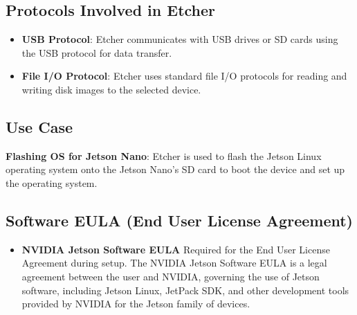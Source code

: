 \subsection*{Protocols Involved in Etcher}
\begin{itemize}
	\item \textbf{USB Protocol}: Etcher communicates with USB drives or SD cards using the USB protocol for data transfer.
	\item \textbf{File I/O Protocol}: Etcher uses standard file I/O protocols for reading and writing disk images to the selected device.
\end{itemize}

\subsection*{Use Case}
\textbf{Flashing OS for Jetson Nano}: Etcher is used to flash the Jetson Linux operating system onto the Jetson Nano’s SD card to boot the device and set up the operating system. \cite{BAC:2025}

\subsection{Software EULA (End User License Agreement)}
\begin{itemize}
	\item \textbf{NVIDIA Jetson Software EULA} Required for the End User License Agreement during setup. The NVIDIA Jetson Software EULA is a legal agreement between the user and NVIDIA, governing the use of Jetson software, including Jetson Linux, JetPack SDK, and other development tools provided by NVIDIA for the Jetson family of devices. \cite{NJE:2025}
\end{itemize}

